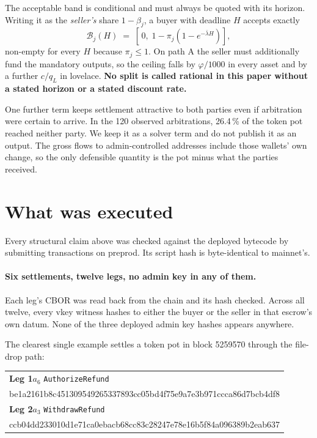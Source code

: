 \documentclass[11pt]{article}
\theoremstyle{remark}
\begin{document}
The acceptable band is conditional and must always be quoted with its horizon. Writing it as the \emph{seller's}
share $1 - \beta_j$, a buyer with deadline $H$ accepts exactly
\[
\mathcal{B}_j(H) \;=\; \left[\, 0,\; 1 - \pi_j\left(1 - e^{-\bar\lambda H}\right) \right] ,
\]
non-empty for every $H$ because $\pi_j \le 1$. On path A the seller must additionally fund the mandatory outputs, so
the ceiling falls by $\varphi/1000$ in every asset and by a further $c/q_L$ in lovelace. \textbf{No split is called
rational in this paper without a stated horizon or a stated discount rate.}

One further term keeps settlement attractive to both parties even if arbitration were certain to arrive. In the 120
observed arbitrations, 26.4\,\% of the token pot reached neither party. We keep it as a solver term and do not
publish it as an output. The gross flows to admin-controlled addresses include those wallets' own change, so the only
defensible quantity is the pot minus what the parties received.

\section{What was executed}

Every structural claim above was checked against the deployed bytecode by submitting transactions on preprod. Its
script hash is byte-identical to mainnet's.

\paragraph{Six settlements, twelve legs, no admin key in any of them.} Each leg's CBOR was read back from the chain
and its hash checked. Across all twelve, every vkey witness hashes to either the buyer or the seller in that escrow's
own datum. None of the three deployed admin key hashes appears anywhere.

The clearest single example settles a token pot in block 5259570 through the file-drop path:

\begin{center}
\small
\begin{tabular}{@{}l@{}}
\toprule
\textbf{Leg 1}\quad $a_6$ \texttt{AuthorizeRefund} \\
{\scriptsize\ttfamily be1a2161b8c451309549265337893cc05bd4f75e9a7e3b971ccca86d7bcb4df8} \\
\addlinespace
\textbf{Leg 2}\quad $a_3$ \texttt{WithdrawRefund} \\
{\scriptsize\ttfamily ccb04dd233010d1e71ca0ebacb68cc83c28247e78e16b5f84a096389b2eab637} \\
\bottomrule
\end{tabular}
\end{center}
\end{document}
